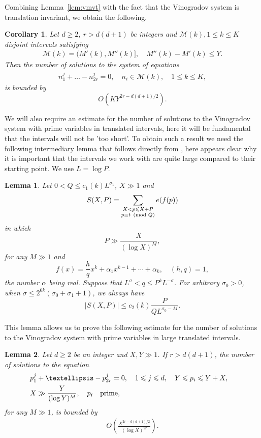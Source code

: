 \documentclass[12pt]{amsart}
\newtheorem{lemma}{Lemma}
\def\cM{{\mathcal M}}
\newtheorem{corollary}{Corollary}
\def\\{\cr}
\def\le{\leqslant}
\def\ge{\geqslant}
\begin{document}
Combining Lemma~\ref{lem:vmvt} with the fact that the Vinogradov system is translation invariant, we obtain the following. 
\begin{corollary}
\label{eq:cor76867}
Let $d\ge 2$, $r>d(d+1)$ be integers and $\cM(k), 1\le k \le K$ disjoint intervals satisfying 
\begin{align*}
\cM(k)=(M'(k),M''(k)], \quad M''(k)-M'(k)\le Y.
\end{align*}
Then the number of solutions to the system of equations 
\begin{align}
\label{eq:system1}
n_1^{j}+\dots-n_{2r}^{j}=0, \quad n_i\in \cM(k), \quad 1\le k \le K,
\end{align}
is bounded by 
$$O(KY^{2r-d(d+1)/2}).$$
\end{corollary}
We will also require an estimate for the number of solutions to the Vinogradov system with prime variables in translated intervals, here it will be fundamental that the intervals will not be 'too short'. 
To obtain such a result we need the following intermediary lemma that follows directly from \cite[Theorem 10]{Hua}, here appears clear why it is important that the intervals we work with are quite large compared to their starting point. We use $L=\log P$.
\begin{lemma}
\label{lem:Plarge}
Let $0<Q\le c_1(k)L^{\sigma_1}$, $X\gg 1$ and
$$S(X,P)=\sum_{\substack{X<p\le X+P \\ p \equiv t \pmod Q}} e(f(p)) $$
in which
$$P\gg \frac{X}{(\log X)^M}, $$
for any $M\gg 1$ and
$$f(x)=\frac{h}{q}x^k+\alpha_1x^{k-1}+\cdots+\alpha_k, \quad (h,q)=1, $$
the number $\alpha $ being real. Suppose that $L^\sigma< q \le P^kL^{-\sigma}$. For arbitrary $\sigma_0>0$, when $\sigma \le 2^{6k}(\sigma_0+\sigma_1+1)$, we always have
$$|S(X,P)| \le c_2(k)\frac{P}{Q L^{\sigma_0-M}}. $$
\end{lemma}
This lemma allows us to prove the following estimate for the number of solutions to the Vinogradov system with prime variables in large translated intervals.
\begin{lemma}
\label{lem:vmvtP1}
Let $d\ge 2$ be an integer and $X, Y\gg 1$. If $r>d(d+1)$,  the number of solutions to the equation 
\begin{align*}
&p_1^{j}+\dots-p_{2r}^{j}=0, \quad 1\le j \le d, \quad Y\le p_i\le Y+X, \\ & X\gg\frac{Y}{(\log Y)^M}, \quad p_i \quad \text{prime},
\end{align*}
for any $M\gg1$, is bounded by 
\begin{align*}
O\left(\frac{X^{2r-d(d+1)/2}}{(\log{X})^{2r}}\right).
\end{align*}
\end{lemma}
\end{document}
